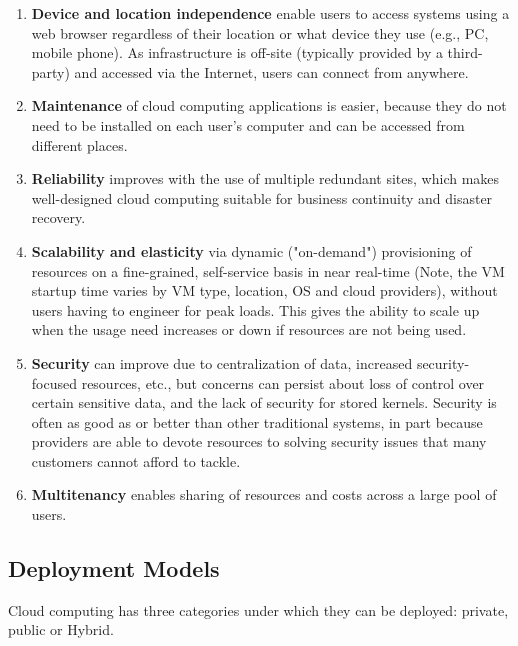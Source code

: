     \begin{enumerate}
        \item \textbf{Device and location independence} enable users to access systems using a web browser regardless of their location or what device they use (e.g., PC, mobile phone). As infrastructure is off-site (typically provided by a third-party) and accessed via the Internet, users can connect from anywhere.
        
        \item \textbf{Maintenance} of cloud computing applications is easier, because they do not need to be installed on each user's computer and can be accessed from different places.
        
        \item \textbf{Reliability} improves with the use of multiple redundant sites, which makes well-designed cloud computing suitable for business continuity and disaster recovery.
        
        \item \textbf{Scalability and elasticity} via dynamic ("on-demand") provisioning of resources on a fine-grained, self-service basis in near real-time (Note, the VM startup time varies by VM type, location, OS and cloud providers), without users having to engineer for peak loads. This gives the ability to scale up when the usage need increases or down if resources are not being used.
        
        \item \textbf{Security} can improve due to centralization of data, increased security-focused resources, etc., but concerns can persist about loss of control over certain sensitive data, and the lack of security for stored kernels. Security is often as good as or better than other traditional systems, in part because providers are able to devote resources to solving security issues that many customers cannot afford to tackle.
        
        \item \textbf{Multitenancy} enables sharing of resources and costs across a large pool of users.
        
    \end{enumerate}
    
    \subsection{Deployment Models}
    Cloud computing has three categories under which they can be deployed: private, public or Hybrid.
    

